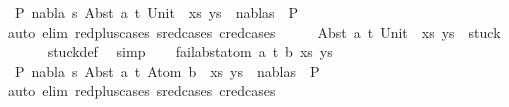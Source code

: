 \begin{isabellebody}
\ {\isachardoublequoteopen}{\isasymnot}\ {\isacharparenleft}{\kern0pt}{\isasymexists}P{}\ nabla\ s{\isachardot}{\kern0pt}\ {\isacharparenleft}{\kern0pt}{\isacharparenleft}{\kern0pt}Abst\ a\ t{\isacharcomma}{\kern0pt}\ Unit{\isacharparenright}{\kern0pt}\ {\isacharhash}{\kern0pt}\ xs{\isacharcomma}{\kern0pt}\ ys{\isacharparenright}{\kern0pt}\ {\isasymTurnstile}\ {\isacharparenleft}{\kern0pt}nabla{\isacharcomma}{\kern0pt}s{\isacharparenright}{\kern0pt}\ {\isasymRightarrow}\ P{}{\isacharparenright}{\kern0pt}{\isachardoublequoteclose}\isanewline
\ \ \ \ \isamarkupfalse%
\ {\isacharparenleft}{\kern0pt}auto\ elim{\isacharcolon}{\kern0pt}\ red{\isacharunderscore}{\kern0pt}plus{\isachardot}{\kern0pt}cases\ s{\isacharunderscore}{\kern0pt}red{\isachardot}{\kern0pt}cases\ c{\isacharunderscore}{\kern0pt}red{\isachardot}{\kern0pt}cases{\isacharparenright}{\kern0pt}\isanewline
\ \ \isamarkupfalse%
\ \isamarkupfalse%
\ {\isachardoublequoteopen}{\isacharparenleft}{\kern0pt}{\isacharparenleft}{\kern0pt}Abst\ a\ t{\isacharcomma}{\kern0pt}\ Unit{\isacharparenright}{\kern0pt}\ {\isacharhash}{\kern0pt}\ xs{\isacharcomma}{\kern0pt}\ ys{\isacharparenright}{\kern0pt}\ {\isasymin}\ stuck{\isachardoublequoteclose}\isanewline
\ \ \ \ \ \isamarkupfalse%
\ stuck{\isacharunderscore}{\kern0pt}def\ \isamarkupfalse%
\ simp\isanewline
{}\isamarkupfalse%
\isanewline
\ \ \isamarkupfalse%
\ {\isacharparenleft}{\kern0pt}fail{\isacharunderscore}{\kern0pt}abst{\isacharunderscore}{\kern0pt}atom\ a\ t\ b\ xs\ ys{\isacharparenright}{\kern0pt}\isanewline
\ \ \isamarkupfalse%
\ {\isachardoublequoteopen}{\isasymnot}\ {\isacharparenleft}{\kern0pt}{\isasymexists}P{}\ nabla\ s{\isachardot}{\kern0pt}\ {\isacharparenleft}{\kern0pt}{\isacharparenleft}{\kern0pt}Abst\ a\ t{\isacharcomma}{\kern0pt}\ Atom\ b{\isacharparenright}{\kern0pt}\ {\isacharhash}{\kern0pt}\ xs{\isacharcomma}{\kern0pt}\ ys{\isacharparenright}{\kern0pt}\ {\isasymTurnstile}\ {\isacharparenleft}{\kern0pt}nabla{\isacharcomma}{\kern0pt}s{\isacharparenright}{\kern0pt}\ {\isasymRightarrow}\ P{}{\isacharparenright}{\kern0pt}{\isachardoublequoteclose}\isanewline
\ \ \ \ \isamarkupfalse%
\ {\isacharparenleft}{\kern0pt}auto\ elim{\isacharcolon}{\kern0pt}\ red{\isacharunderscore}{\kern0pt}plus{\isachardot}{\kern0pt}cases\ s{\isacharunderscore}{\kern0pt}red{\isachardot}{\kern0pt}cases\ c{\isacharunderscore}{\kern0pt}red{\isachardot}{\kern0pt}cases{\isacharparenright}{\kern0pt}\isanewline

\end{isabellebody}
